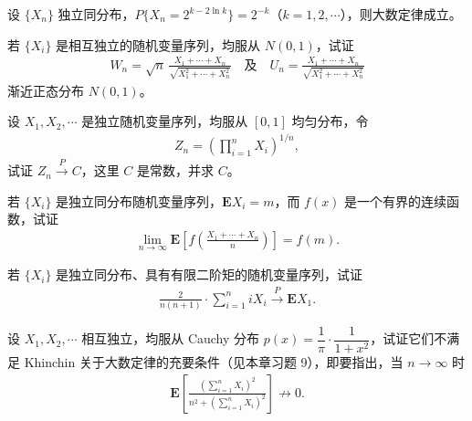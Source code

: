\documentclass[../../main.tex]{subfiles}
\begin{document}
\begin{exercise}\label{exercise:ch05-38}
设 $\{X_n\}$ 独立同分布，$P\{X_n=2^{k-2\ln k}\}=2^{-k}$（$k=1,2,\cdots$），则大数定律成立。
\end{exercise}

\begin{exercise}\label{exercise:ch05-39}
若 $\{X_i\}$ 是相互独立的随机变量序列，均服从 $N(0,1)$，试证
\begin{align*}
W_n=\sqrt{n}\,\frac{X_1+\cdots+X_n}{\sqrt{X_1^{2}+\cdots+X_n^{2}}}\quad\text{及}\quad U_n=\frac{X_1+\cdots+X_n}{\sqrt{X_1^{2}+\cdots+X_n^{2}}}
\end{align*}
渐近正态分布 $N(0,1)$。
\end{exercise}

\begin{exercise}\label{exercise:ch05-40}
设 $X_1,X_2,\cdots$ 是独立随机变量序列，均服从 $[0,1]$ 均匀分布，令
\begin{align*}
Z_n=\left(\prod_{i=1}^{n}X_i\right)^{1/n},
\end{align*}
试证 $Z_n\xrightarrow{P}C$，这里 $C$ 是常数，并求 $C$。
\end{exercise}

\begin{exercise}\label{exercise:ch05-41}
若 $\{X_i\}$ 是独立同分布随机变量序列，$\boldsymbol{E}X_i=m$，而 $f(x)$ 是一个有界的连续函数，试证
\begin{align*}
\lim_{n\to\infty}\boldsymbol{E}\!\left[f\!\left(\frac{X_1+\cdots+X_n}{n}\right)\right]=f(m).
\end{align*}
\end{exercise}

\begin{exercise}\label{exercise:ch05-42}
若 $\{X_i\}$ 是独立同分布、具有有限二阶矩的随机变量序列，试证
\begin{align*}
\frac{2}{n(n+1)}\cdot\sum_{i=1}^{n}iX_i\xrightarrow{P}\boldsymbol{E}X_1.
\end{align*}
\end{exercise}

\begin{exercise}\label{exercise:ch05-43}
设 $X_1,X_2,\cdots$ 相互独立，均服从 Cauchy 分布 $p(x)=\dfrac1\pi\cdot\dfrac{1}{1+x^{2}}$，试证它们不满足 Khinchin 关于大数定律的充要条件（见本章习题 9），即要指出，当 $n\to\infty$ 时
\begin{align*}
\boldsymbol{E}\!\left[\frac{\left(\sum_{i=1}^{n}X_i\right)^{2}}{n^{2}+\left(\sum_{i=1}^{n}X_i\right)^{2}}\right]\not\to0.
\end{align*}
\end{exercise}
\end{document}
